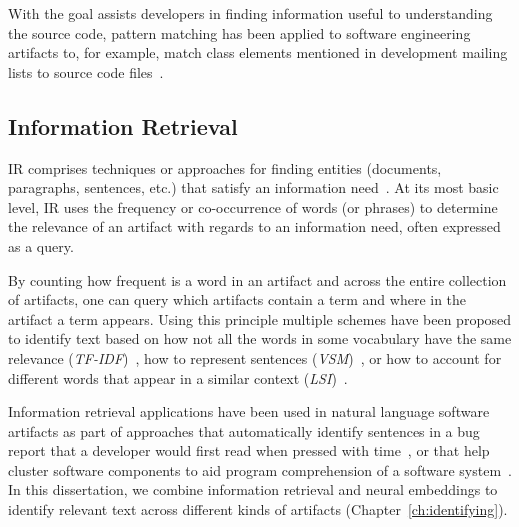 With the goal 
 assists developers in finding information useful to 
 understanding the source code,
pattern matching has been applied to software engineering artifacts
to, for example, match class elements mentioned in development mailing 
 lists to source code files~\cite{panichella2012}.






\subsection{Information Retrieval }
\label{cp2:information-retrieval}


\acf{IR} comprises techniques
or approaches for finding entities (documents, paragraphs, sentences, etc.)
that satisfy an information need~\cite{manning2010IR}.
At its most basic level, 
\acs{IR}
uses the 
frequency or co-occurrence of words (or phrases) to determine the relevance
of an artifact with regards to an information need, often expressed as a query.


By counting how frequent is a word in 
an artifact and across the entire collection of artifacts, 
one can query which artifacts contain a term and where in the artifact a term appears. 
Using this principle multiple schemes have been proposed 
to identify text based on 
how not all the words in some vocabulary have the same relevance (\textit{TF-IDF})~\cite{luhn1957tf, jones2004idf}, 
how to  represent sentences (\textit{VSM})~\cite{salton1975vector}, 
or how to account for different words that appear in a similar context (\textit{LSI})~\cite{dumais1994latent}.





Information retrieval applications have been used in natural language software artifacts 
as part of approaches that
automatically identify sentences in a bug report that a developer would first read when pressed with time~\cite{Lotufo2012},
or that help cluster software components to aid program comprehension of a software system~\cite{Marcus2003}.
In this dissertation, we combine information retrieval and neural embeddings 
to identify relevant text across different kinds of artifacts (Chapter~\ref{ch:identifying}).




